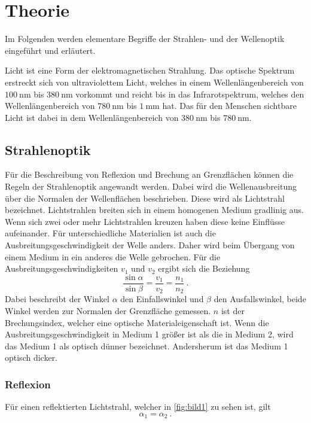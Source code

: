 \section{Theorie}
\label{sec:theorie}

Im Folgenden werden elementare Begriffe der Strahlen- und der Wellenoptik eingeführt und erläutert.

Licht ist eine Form der elektromagnetischen Strahlung. Das optische Spektrum erstreckt sich von ultraviolettem Licht, welches 
in einem Wellenlängenbereich von $\SI{100}{\nano\meter}$ bis $\SI{380}{\nano\meter}$ vorkommt und reicht bis in das Infrarotspektrum, welches 
den Wellenlängenbereich von $\SI{780}{\nano\meter}$ bis $\SI{1}{\milli\meter}$ hat. Das für den Menschen sichtbare Licht ist dabei in dem 
Wellenlängenbereich von $\SI{380}{\nano\meter}$ bis $\SI{780}{\nano\meter}$.

\subsection{Strahlenoptik}
\label{sec:Strahlenoptik}
 
Für die Beschreibung von Reflexion und Brechung an Grenzflächen können die Regeln der Strahlenoptik angewandt werden.
Dabei wird die Wellenausbreitung über die Normalen der Wellenflächen beschrieben. Diese wird als Lichtstrahl bezeichnet.
Lichtstrahlen breiten sich in einem homogenen Medium gradlinig aus. Wenn sich zwei oder mehr Lichtstrahlen kreuzen haben diese
keine Einflüsse aufeinander.
Für unterschiedliche Materialien ist auch die Ausbreitungsgeschwindigkeit der Welle anders. Daher wird beim Übergang von einem
Medium in ein anderes die Welle gebrochen. Für die Ausbreitungsgeschwindigkeiten $v_1$ und $v_2$ ergibt sich die Beziehung
\begin{equation}
    \frac{\sin \alpha}{\sin \beta} =\frac{v_1}{v_2} = \frac{n_1}{n_2}\:.
    \label{eqn:bez}
\end{equation}
Dabei beschreibt der Winkel $\alpha$ den Einfallswinkel und $\beta$ den Ausfallswinkel, beide Winkel werden zur Normalen der Grenzfläche gemessen. 
$n$ ist der Brechungsindex, welcher eine optische Materialeigenschaft ist.
Wenn die Ausbreitungsgeschwindigkeit in Medium 1 größer ist als die in Medium 2, wird das Medium 1 als optisch dünner 
bezeichnet. Andersherum ist das Medium 1 optisch dicker.

\subsubsection{Reflexion}
\label{sec:Reflexion}
Für einen reflektierten Lichtstrahl, welcher in \autoref{fig:bild1} zu sehen ist, gilt
\begin{equation}
    \alpha_1 = \alpha_2 \: .
    \label{eqn:relex}
\end{equation}

